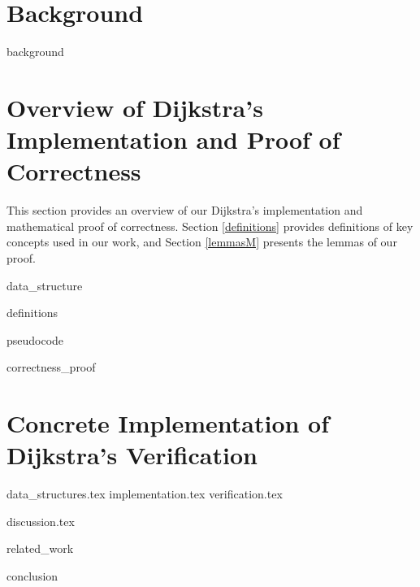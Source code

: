 \documentclass[11pt, a4paper]{article} %
\theoremstyle{definition}
\begin{document}
\section{Background}
{background}

\section{Overview of Dijkstra's Implementation and Proof of Correctness}
This section provides an overview of our Dijkstra's implementation and mathematical proof of correctness. Section \ref{definitions} provides definitions of key concepts used in our work, and Section \ref{lemmasM} presents the lemmas of our proof.  

{data_structure}

{definitions}

{pseudocode}

{correctness_proof}


\section{Concrete Implementation of Dijkstra's Verification}
{data_structures.tex}
{implementation.tex}
{verification.tex}


{discussion.tex}


{related_work}



{conclusion}

\newpage %
\end{document}
